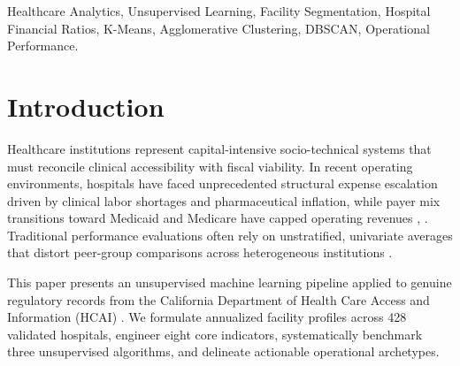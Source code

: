 \documentclass[conference]{IEEEtran}
\begin{document}
\begin{IEEEkeywords}
Healthcare Analytics, Unsupervised Learning, Facility Segmentation, Hospital Financial Ratios, K-Means, Agglomerative Clustering, DBSCAN, Operational Performance.
\end{IEEEkeywords}

\section{Introduction}
Healthcare institutions represent capital-intensive socio-technical systems that must reconcile clinical accessibility with fiscal viability. In recent operating environments, hospitals have faced unprecedented structural expense escalation driven by clinical labor shortages and pharmaceutical inflation, while payer mix transitions toward Medicaid and Medicare have capped operating revenues \cite{zarrin2022homogeneity}, \cite{joynt2022association}. Traditional performance evaluations often rely on unstratified, univariate averages that distort peer-group comparisons across heterogeneous institutions \cite{benmoussa2024private}.

This paper presents an unsupervised machine learning pipeline applied to genuine regulatory records from the California Department of Health Care Access and Information (HCAI) \cite{yousefi2024innovative}. We formulate annualized facility profiles across 428 validated hospitals, engineer eight core indicators, systematically benchmark three unsupervised algorithms, and delineate actionable operational archetypes.
\end{document}
